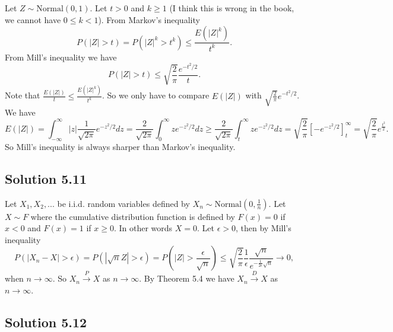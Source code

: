Let $Z \sim \mathrm{Normal}(0, 1)$.
Let $t > 0$ and $k \geq 1$ (I think this is wrong in the book, we cannot have $0 \leq k < 1$).
From Markov's inequality
\begin{equation*}
    P(|Z| > t) = P(|Z|^k > t^k)
        \leq \frac{E(|Z|^k)}{t^k}.
\end{equation*}
From Mill's inequality we have
\begin{equation*}
    P(|Z| > t) \leq \sqrt{\frac{2}{\pi}} \frac{e^{-t^2/2}}{t}.
\end{equation*}
Note that $\frac{E(|Z|)}{t} \leq \frac{E(|Z|^k)}{t^k}$.
So we only have to compare $E(|Z|)$ with $\sqrt{\frac{2}{\pi}} e^{-t^2/2}$.
We have
\begin{equation*}
    E(|Z|) = \int_{-\infty}^{\infty} |z| \frac{1}{\sqrt{2\pi}} e^{-z^2/2} dz
        = \frac{2}{\sqrt{2\pi}} \int_0^{\infty} z e^{-z^2/2} dz
        \geq \frac{2}{\sqrt{2\pi}} \int_t^{\infty} z e^{-z^2/2} dz
        = \sqrt{\frac{2}{\pi}} \left[ -e^{-z^2/2} \right]_{t}^{\infty}
        = \sqrt{\frac{2}{\pi}} e^{\frac{t^2}{2}}.
\end{equation*}
So Mill's inequality is always sharper than Markov's inequality.


\subsection*{Solution 5.11}

Let $X_1, X_2, ...$ be i.i.d. random variables defined by $X_n \sim \mathrm{Normal}(0, \frac{1}{n})$.
Let $X \sim F$ where the cumulative distribution function is defined by $F(x) = 0$ if $x < 0$ and $F(x) = 1$ if $x \geq 0$.
In other words $X = 0$.
Let $\epsilon > 0$, then by Mill's inequality
\begin{equation*}
    P(|X_n - X| > \epsilon) = P(|\sqrt{n} Z| > \epsilon)
        = P(|Z| > \frac{\epsilon}{\sqrt{n}})
        \leq \sqrt{\frac{2}{\pi}} \frac{1}{\epsilon} \frac{\sqrt{n}}{e^{-\frac{1}{2\epsilon} \sqrt{n}}}
        \to 0,
\end{equation*}
when $n \to \infty$.
So $X_n \xrightarrow{P} X$ as $n \to \infty$.
By Theorem 5.4 we have $X_n \xrightarrow{D} X$ as $n \to \infty$.


\subsection*{Solution 5.12}

